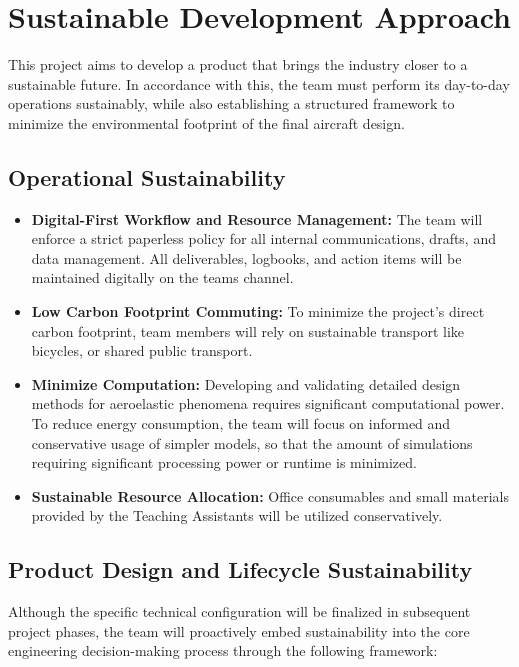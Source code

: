 \chapter{Sustainable Development Approach}
This project aims to develop a product that brings the industry closer to a sustainable future. In accordance with this, the team must perform its day-to-day operations sustainably, while also establishing a structured framework to minimize the environmental footprint of the final aircraft design.

\section{Operational Sustainability}

\begin{itemize}[leftmargin=*]
    \item \textbf{Digital-First Workflow and Resource Management:} The team will enforce a strict paperless policy for all internal communications, drafts, and data management. All deliverables, logbooks, and action items will be maintained digitally on the teams channel.
    
    \item \textbf{Low Carbon Footprint Commuting:} To minimize the project's direct carbon footprint, team members will rely on sustainable transport like bicycles, or shared public transport.

    \item \textbf{Minimize Computation:} Developing and validating detailed design methods for aeroelastic phenomena requires significant computational power. To reduce energy consumption, the team will focus on informed and conservative usage of simpler models, so that the amount of simulations requiring significant processing power or runtime is minimized. 
    
    \item \textbf{Sustainable Resource Allocation:} Office consumables and small materials provided by the Teaching Assistants will be utilized conservatively.
\end{itemize}

\section{Product Design and Lifecycle Sustainability}

Although the specific technical configuration will be finalized in subsequent project phases, the team will proactively embed sustainability into the core engineering decision-making process through the following framework:

